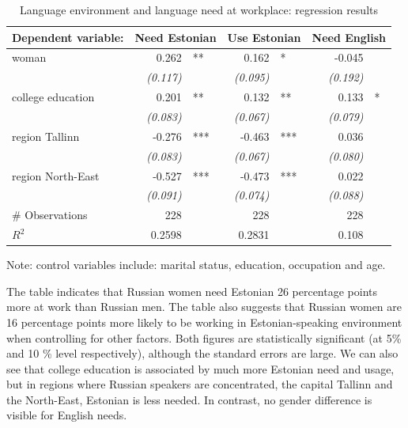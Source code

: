 \documentclass[12pt, a4paper]{article}
\newcommand{\std}[1]{\emph{(#1)}}
\begin{document}
\begin{table}[t]
	\centering
	\caption{Language environment and language need at workplace:
		regression results}
	\label{tab:environment_model}
	\begin{tabular}{l r@{}l r@{}l r@{}l}
		\toprule
		Dependent variable: & \multicolumn{2}{c}{Need Estonian} & \multicolumn{2}{c}{Use Estonian} & \multicolumn{2}{c}{Need English} \\ \midrule
		woman             & 0.262       & **  & 0.162       & *   & -0.045      &   \\
		                  & \std{0.117} &     & \std{0.095} &     & \std{0.192} &   \\
		college education & 0.201       & **  & 0.132       & **  & 0.133       & * \\
		                  & \std{0.083} &     & \std{0.067} &     & \std{0.079} &   \\
		region Tallinn    & -0.276      & *** & -0.463      & *** & 0.036       &   \\
		                  & \std{0.083} &     & \std{0.067} &     & \std{0.080} &   \\
		region North-East & -0.527      & *** & -0.473      & *** & 0.022       &   \\
		                  & \std{0.091} &     & \std{0.074} &     & \std{0.088} &   \\ \midrule
		\# Observations             & 228         &     & 228         &     & 228         &   \\
		$R^{2}$           & 0.2598      &     & 0.2831      &     & 0.108       &   \\ \bottomrule
	\end{tabular}
	\begin{flushleft}
		Note: control variables include: marital status, education,
		occupation and age.
	\end{flushleft}
\end{table}

The table indicates that Russian women need Estonian 26 percentage
points more at work than Russian men.  The table also suggests that
Russian women are 16 percentage points more likely to be working in
Estonian-speaking environment when controlling for other factors.
Both figures are statistically significant (at 5\% and 10 \% level
respectively), although the standard errors are large.  We can also see that
college education is associated by much more Estonian need and usage,
but in regions where Russian speakers are concentrated, the capital
Tallinn and the North-East, Estonian is less needed.  In contrast, no
gender difference is visible for English needs.
\end{document}
